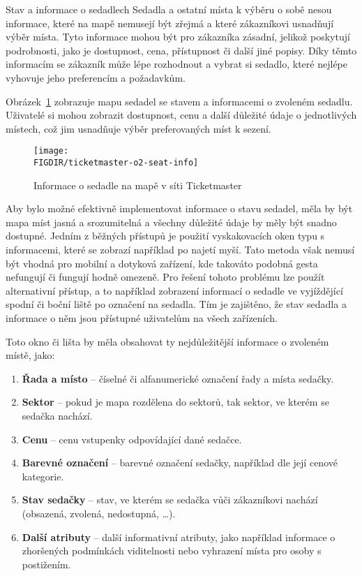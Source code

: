 \begin{subsection}{Stav a informace o sedadlech}
    \label{subsec:identifikace-interaktivni-mapa-stav-a-informace-o-sedadlech}
    Sedadla a ostatní místa k výběru o sobě nesou informace, které na mapě nemusejí být zřejmá a které zákazníkovi usnadňují výběr místa.
    Tyto informace mohou být pro zákazníka zásadní, jelikož poskytují podrobnosti, jako je dostupnost, cena, přístupnost či další jiné popisy.
    Díky těmto informacím se zákazník může lépe rozhodnout a vybrat si sedadlo, které nejlépe vyhovuje jeho preferencím a požadavkům.

    Obrázek~\ref{fig:ticketmaster-o2-seat-info} zobrazuje mapu sedadel se stavem a informacemi o zvoleném sedadlu.
    Uživatelé si mohou zobrazit dostupnost, cenu a další důležité údaje o jednotlivých místech, což jim usnadňuje výběr preferovaných míst k sezení.

    \begin{figure}[H]
        \texttt{[image: \\FIGDIR/ticketmaster-o2-seat-info]}
        \centering
        \caption{Informace o sedadle na mapě v síti Ticketmaster\cite{t__www_ticketmaster_com}}
        \label{fig:ticketmaster-o2-seat-info}
    \end{figure}

    Aby bylo možné efektivně implementovat informace o stavu sedadel, měla by být mapa míst jasná a srozumitelná a všechny důležité údaje by měly být snadno dostupné.
    Jedním z běžných přístupů je použití vyskakovacích oken typu  s informacemi, které se zobrazí například po najetí myší.
    Tato metoda však nemusí být vhodná pro mobilní a dotyková zařízení, kde takováto podobná gesta nefungují či fungují hodně omezeně.
    Pro řešení tohoto problému lze použít alternativní přístup, a to například zobrazení informací o sedadle ve vyjíždějící spodní či boční liště po označení na sedadla.
    Tím je zajištěno, že stav sedadla a informace o něm jsou přístupné uživatelům na všech zařízeních.

    Toto okno či lišta by měla obsahovat ty nejdůležitější informace o zvoleném místě, jako:
    \begin{enumerate}
        \item \textbf{Řada a místo} – číselné či alfanumerické označení řady a místa sedačky.
        \item \textbf{Sektor} – pokud je mapa rozdělena do sektorů, tak sektor, ve kterém se sedačka nachází.
        \item \textbf{Cenu} – cenu vstupenky odpovídající dané sedačce.
        \item \textbf{Barevné označení} – barevné označení sedačky, například dle její cenové kategorie.
        \item \textbf{Stav sedačky} – stav, ve kterém se sedačka vůči zákazníkovi nachází (obsazená, zvolená, nedostupná, \ldots).
        \item \textbf{Další atributy} – další informativní atributy, jako například informace o zhoršených podmínkách viditelnosti nebo vyhrazení místa pro osoby s postižením.
    \end{enumerate}
\end{subsection}

